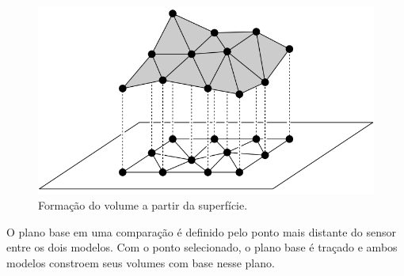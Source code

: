 \begin{figure}[H]
    \centering
    \includegraphics[scale=0.5]{dados/figuras/prisms.png}
    \caption{Formação do volume a partir da superfície.}
    \vspace{-0.8em}
    \label{fig:prism}
\end{figure}

O plano base em uma comparação é definido pelo ponto mais distante do sensor entre os dois modelos.
Com o ponto selecionado, o plano base é traçado e ambos modelos constroem seus volumes com base nesse plano.

